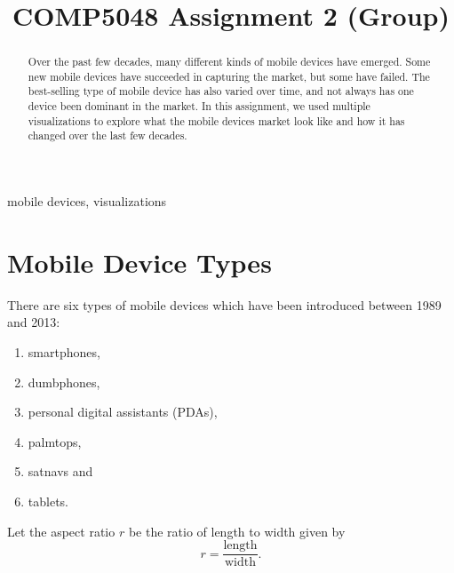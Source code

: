 \documentclass[conference]{IEEEtran}
\begin{document}
\title{COMP5048 Assignment 2 (Group)}

\author{
\and
{}
\and
{}
\and
{}
\and
{}
}

\maketitle

\begin{abstract}
Over the past few decades, many different kinds of mobile devices have emerged. Some new mobile devices have succeeded in capturing the market, but some have failed. The best-selling type of mobile device has also varied over time, and not always has one device been dominant in the market. In this assignment, we used multiple visualizations to explore what the mobile devices market look like and how it has changed over the last few decades.
\end{abstract}

\begin{IEEEkeywords}
mobile devices, visualizations
\end{IEEEkeywords}

\section{Mobile Device Types}
\label{sec:A}

There are six types of mobile devices which have been introduced between 1989
and 2013:
\begin{enumerate}
	\item smartphones,
	\item dumbphones,
	\item personal digital assistants (PDAs),
	\item palmtops,
	\item satnavs and
	\item tablets.
\end{enumerate}

Let the aspect ratio $r$ be the ratio of length to width given by
\[ r = \frac{\text{length}}{\text{width}}. \]
\end{document}
